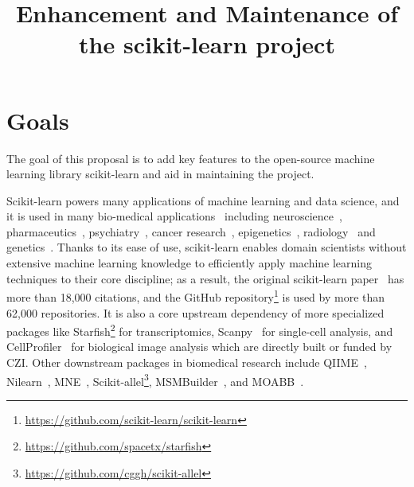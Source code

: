 \documentclass[11pt]{article}  %
\title{Enhancement and Maintenance of the scikit-learn project\vspace{-3ex}}
\date{\vspace{-5ex}}
\begin{document}
\maketitle
\section{Goals}



The goal of this proposal is to add key features to the open-source machine learning library scikit-learn and aid in maintaining the project.

Scikit-learn powers many applications of machine learning and data science,
and it is used in many bio-medical
applications~\cite{roles_of_ml_in_biomed_science} including neuroscience~\cite{zandifar2017comparison, valera2016stereotyped, spike_sorting}, pharmaceutics~\cite{lindh2017predicting, lorberbaum2015systems, segler2017generating}, psychiatry~\cite{schmidt2015approaching, 10.1001/2013.jamapsychiatry.5, patel2015machine}, cancer research~\cite{bakas2017advancing, TAYLOR2018676, chaudhary2018deep}, epigenetics~\cite{wang2017epigenetic, kakaradov2017early, dogan2018integrated}, radiology~\cite{masino2016temporal,wang2015evaluation} and genetics~\cite{LAMANNO2016566, horlbeck2016compact, brannan2016sonar}. Thanks to its ease of use, scikit-learn enables domain scientists without extensive machine learning knowledge to efficiently apply machine learning techniques to their core
discipline; as a result, the original scikit-learn paper~\cite{scikit-learn} has more
than 18,000 citations, and the GitHub repository\footnote{\href{https://github.com/scikit-learn/scikit-learn}{https://github.com/scikit-learn/scikit-learn}} is used by more than 62,000 repositories. It is also a core upstream dependency of more
specialized packages like Starfish\footnote{\href{https://github.com/spacetx/starfish}{https://github.com/spacetx/starfish}} for transcriptomics, Scanpy~\cite{scanpy} for single-cell analysis, and CellProfiler~\cite{cellprofiler} for biological image analysis which are directly built or funded by CZI. Other downstream packages in biomedical research include
QIIME~\cite{QIIME2, QIIME2_feature_classifier,
QIIME2_sample_classifier}, Nilearn~\cite{Neuro_imaging_sklearn}, MNE~\cite{MNE},
Scikit-allel\footnote{\href{https://github.com/cggh/scikit-allel}{https://github.com/cggh/scikit-allel}},
MSMBuilder~\cite{MSMBuilder}, and MOABB~\cite{MOABB}.
\end{document}
